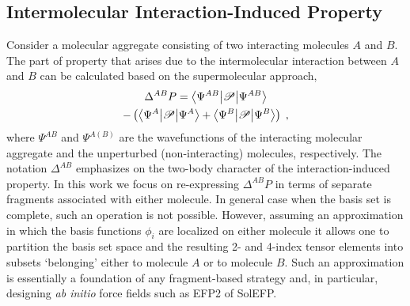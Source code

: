 

\subsection{\label{ss:2.1}Intermolecular Interaction-Induced Property}

Consider a molecular aggregate consisting of two interacting 
molecules $A$ and $B$. The part of property that arises due to the
intermolecular interaction between $A$ and $B$ can be calculated
based on the supermolecular approach,
%
\begin{multline} \label{e:delta-p}
	\Delta^{AB} P = \bigl\langle {\Psi^{AB}} \bigl\lvert {\mathscr{P}} \bigl\lvert {\Psi^{AB}} \bigr\rangle \\- 
	\left(
	    \bigl\langle {\Psi^{A}} \bigl\lvert {\mathscr{P}} \bigl\lvert {\Psi^{A}} \bigr\rangle +
	    \bigl\langle {\Psi^{B}} \bigl\lvert {\mathscr{P}} \bigl\lvert {\Psi^{B}} \bigr\rangle
	\right)
	\;,
\end{multline}
%
where $\Psi^{AB}$ and $\Psi^{A(B)}$ are the wavefunctions of the interacting molecular aggregate
and the unperturbed (non\hyp{}interacting) molecules, respectively.
The notation $\Delta^{AB}$ emphasizes on the two\hyp{}body character of the interaction\hyp{}induced
property. In this work we focus on re\hyp{}expressing $\Delta^{AB}P$ in terms of separate
fragments associated with either molecule. In general case when the basis set
is complete, such an operation is not possible. However,
assuming an approximation
in which the basis functions $\phi_i$ 
are localized on either molecule it allows one to partition the basis set space
and the resulting 2\hyp{} and 4\hyp{}index tensor elements
into subsets `belonging' either to molecule $A$ or to molecule $B$.
Such an approximation is essentially a foundation of any fragment\hyp{}based strategy
and, in particular, designing \emph{ab initio} force fields such as EFP2
of SolEFP.

